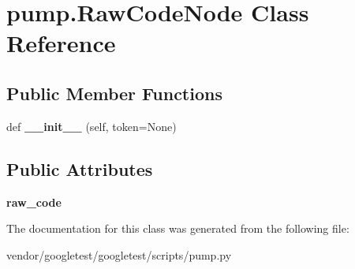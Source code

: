 \hypertarget{classpump_1_1_raw_code_node}{}\section{pump.\+Raw\+Code\+Node Class Reference}
\label{classpump_1_1_raw_code_node}
\subsection*{Public Member Functions}
\begin{DoxyCompactItemize}
\item 
\mbox{\label{classpump_1_1_raw_code_node_a7ba81f4da42d4e96a89713032867f87f}} 
def {\bfseries \+\_\+\+\_\+init\+\_\+\+\_\+} (self, token=None)
\end{DoxyCompactItemize}
\subsection*{Public Attributes}
\begin{DoxyCompactItemize}
\item 
\mbox{\label{classpump_1_1_raw_code_node_ab36224d959e0d8f803e9fac8e6a0baab}} 
{\bfseries raw\+\_\+code}
\end{DoxyCompactItemize}


The documentation for this class was generated from the following file\+:\begin{DoxyCompactItemize}
\item 
vendor/googletest/googletest/scripts/pump.\+py\end{DoxyCompactItemize}
